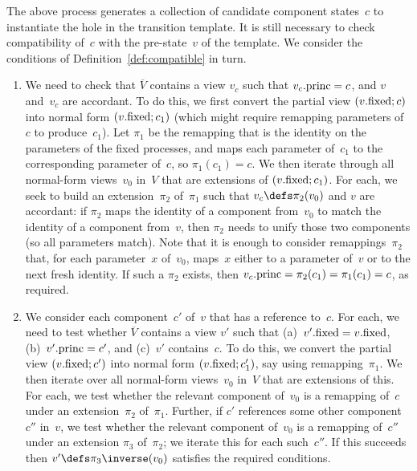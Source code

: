 The above process generates a collection of candidate component states~$c$ to
instantiate the hole in the transition template.  It is still necessary to
check compatibility of~$c$ with the pre-state~$v$ of the template.  We
consider the conditions of Definition~\ref{def:compatible} in turn.
%
\begin{enumerate}
\item We need to check that $\overline{V}$ contains a view $v_c$ such that
  $v_c.\mathrm{princ} = c$, and $v$ and~$v_c$ are accordant.  To do this, we first
  convert the partial view $(v.\mathrm{fixed}; c)$ into normal form $(v.\mathrm{fixed}; c_1)$
  (which might require remapping parameters of~$c$ to produce~$c_1$).  Let
  $\pi_1$ be the remapping that is the identity on the parameters of the fixed
  processes, and maps each parameter of~$c_1$ to the corresponding parameter
  of~$c$, so $\pi_1(c_1) = c$.  We then iterate through all normal-form
  views~$v_0$ in~$V$ that are extensions of $(v.\mathrm{fixed}; c_1)$.  For each, we
  seek to build an extension~$\pi_2$ of~$\pi_1$ such that $v_c \defs
  \pi_2(v_0)$ and $v$ are accordant: if $\pi_2$ maps the identity of a
  component from~$v_0$ to match the identity of a component from~$v$, then
  $\pi_2$ needs to unify those two components (so all parameters match).  Note
  that it is enough to consider remappings~$\pi_2$ that, for each
  parameter~$x$ of~$v_0$, maps~$x$ either to a parameter of~$v$ or to the next
  fresh identity.  If such a $\pi_2$ exists, then $v_c.\mathrm{princ} = \pi_2(c_1) =
  \pi_1(c_1) = c$, as required.

\item We consider each component~$c'$ of~$v$ that has a reference to~$c$.  For
  each, we need to test whether $\overline{V}$ contains a view $v'$ such that
  (a)~$v'.\mathrm{fixed} = v.\mathrm{fixed}$, (b)~$v'.\mathrm{princ} = c'$, and (c)~$v'$ contains~$c$.
  To do this, we convert the partial view $(v.\mathrm{fixed}; c')$ into normal form
  $(v.\mathrm{fixed}; c_1')$, say using remapping~$\pi_1$.  We then iterate over all
  normal-form views~$v_0$ in~$V$ that are extensions of this.  For each, we
  test whether the relevant component of~$v_0$ is a remapping of~$c$ under an
  extension~$\pi_2$ of~$\pi_1$.  Further, if $c'$ references some other
  component~$c''$ in~$v$, we test whether the relevant component of~$v_0$ is a
  remapping of~$c''$ under an extension $\pi_3$ of~$\pi_2$; we iterate this
  for each such~$c''$.  If this succeeds then $v' \defs \pi_3\inverse(v_0)$
  satisfies the required conditions.
\end{enumerate}

